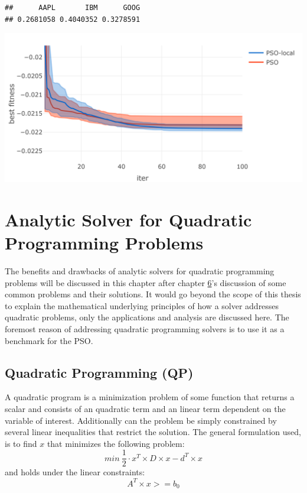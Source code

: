 \documentclass[
  oneside]{book}
\begin{document}
\begin{verbatim}
##      AAPL       IBM      GOOG 
## 0.2681058 0.4040352 0.3278591
\end{verbatim}

\includegraphics{Master_Thesis_files/figure-latex/unnamed-chunk-12-1.png}

\hypertarget{analytic-solver-for-quadratic-programming-problems}{%
\chapter{Analytic Solver for Quadratic Programming Problems}\label{analytic-solver-for-quadratic-programming-problems}}

The benefits and drawbacks of analytic solvers for quadratic programming problems will be discussed in this chapter after chapter \href{challenges}{6}'s discussion of some common problems and their solutions. It would go beyond the scope of this thesis to explain the mathematical underlying principles of how a solver addresses quadratic problems, only the applications and analysis are discussed here. The foremost reason of addressing quadratic programming solvers is to use it as a benchmark for the PSO.

\hypertarget{quadratic-programming-qp}{%
\section{Quadratic Programming (QP)}\label{quadratic-programming-qp}}

A quadratic program is a minimization problem of some function that returns a scalar and consists of an quadratic term and an linear term dependent on the variable of interest. Additionally can the problem be simply constrained by several linear inequalities that restrict the solution. The general formulation used, is to find \(x\) that minimizes the following problem:
\[
  min \ \frac{1}{2} \cdot x^T \times D \times x - d^T \times x 
\]
and holds under the linear constraints:
\[
  A^T \times x >= b_0
\]
\end{document}
